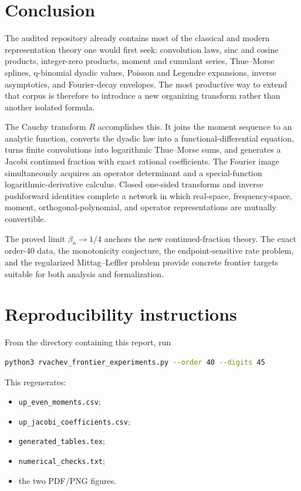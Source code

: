 \documentclass[11pt]{article}
\theoremstyle{definition}
\theoremstyle{remark}
\begin{document}
\section{Conclusion}

The audited repository already contains most of the classical and modern representation
theory one would first seek: convolution laws, sinc and cosine products, integer-zero
products, moment and cumulant series, Thue--Morse splines, q-binomial dyadic values,
Poisson and Legendre expansions, inverse asymptotics, and Fourier-decay envelopes.  The
most productive way to extend that corpus is therefore to introduce a new organizing
transform rather than another isolated formula.

The Cauchy transform \(R\) accomplishes this.  It joins the moment sequence to an analytic
function, converts the dyadic law into a functional-differential equation, turns finite
convolutions into logarithmic Thue--Morse sums, and generates a Jacobi continued fraction
with exact rational coefficients.  The Fourier image simultaneously acquires an operator
determinant and a special-function logarithmic-derivative calculus.  Closed one-sided
transforms and inverse pushforward identities complete a network in which real-space,
frequency-space, moment, orthogonal-polynomial, and operator representations are mutually
convertible.

The proved limit \(\beta_n\to1/4\) anchors the new continued-fraction theory.  The exact
order-40 data, the monotonicity conjecture, the endpoint-sensitive rate problem, and the
regularized Mittag--Leffler problem provide concrete frontier targets suitable for both
analysis and formalization.

\appendix

\section{Reproducibility instructions}\label{p3:app:repro}

From the directory containing this report, run
\begin{lstlisting}[language=bash]
python3 rvachev_frontier_experiments.py --order 40 --digits 45
\end{lstlisting}
This regenerates:
\begin{itemize}
\item \texttt{up\_even\_moments.csv};
\item \texttt{up\_jacobi\_coefficients.csv};
\item \texttt{generated\_tables.tex};
\item \texttt{numerical\_checks.txt};
\item the two PDF/PNG figures.
\end{itemize}
\end{document}
